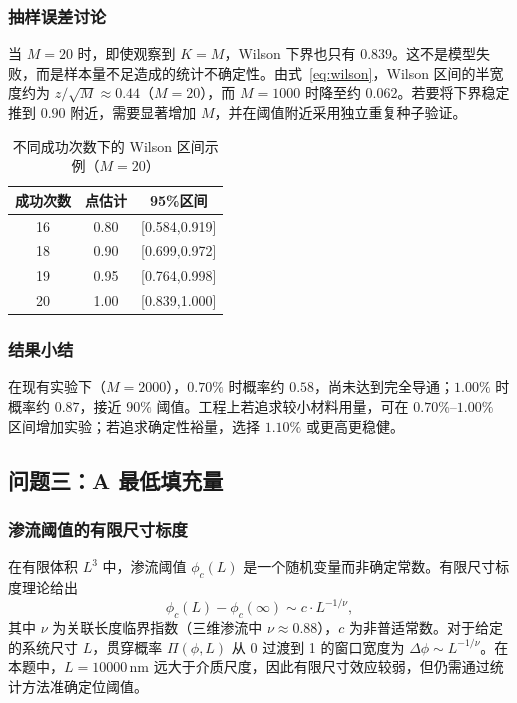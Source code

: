 \documentclass[12pt,a4paper,fontset=windows]{ctexart}
\newcommand{\nm}{\,\mathrm{nm}}
\begin{document}
\subsubsection{抽样误差讨论}
当 $M=20$ 时，即使观察到 $K=M$，Wilson 下界也只有 $0.839$。这不是模型失败，而是样本量不足造成的统计不确定性。由式~\eqref{eq:wilson}，Wilson 区间的半宽度约为 $z/\sqrt{M}\approx 0.44$（$M=20$），而 $M=1000$ 时降至约 $0.062$。若要将下界稳定推到 $0.90$ 附近，需要显著增加 $M$，并在阈值附近采用独立重复种子验证。
\begin{table}[H]\centering\caption{不同成功次数下的 Wilson 区间示例（$M=20$）}\begin{tabular}{ccc}\toprule 成功次数&点估计&95\%区间\\\midrule 16&0.80&[0.584,0.919]\\18&0.90&[0.699,0.972]\\19&0.95&[0.764,0.998]\\20&1.00&[0.839,1.000]\\\bottomrule\end{tabular}\end{table}

\subsubsection{结果小结}
在现有实验下（$M=2000$），$0.70\%$ 时概率约 $0.58$，尚未达到完全导通；$1.00\%$ 时概率约 $0.87$，接近 $90\%$ 阈值。工程上若追求较小材料用量，可在 $0.70\%$--$1.00\%$ 区间增加实验；若追求确定性裕量，选择 $1.10\%$ 或更高更稳健。

\subsection{问题三：A 最低填充量}

\subsubsection{渗流阈值的有限尺寸标度}
在有限体积 $L^3$ 中，渗流阈值 $\phi_c(L)$ 是一个随机变量而非确定常数\cite{ziff2002}。有限尺寸标度理论给出
\begin{equation}
\phi_c(L) - \phi_c(\infty) \sim c \cdot L^{-1/\nu},
\label{eq:fss}
\end{equation}
其中 $\nu$ 为关联长度临界指数（三维渗流中 $\nu\approx 0.88$），$c$ 为非普适常数。对于给定的系统尺寸 $L$，贯穿概率 $\Pi(\phi,L)$ 从 0 过渡到 1 的窗口宽度为 $\Delta\phi\sim L^{-1/\nu}$。在本题中，$L=10000\nm$ 远大于介质尺度，因此有限尺寸效应较弱，但仍需通过统计方法准确定位阈值。
\end{document}
